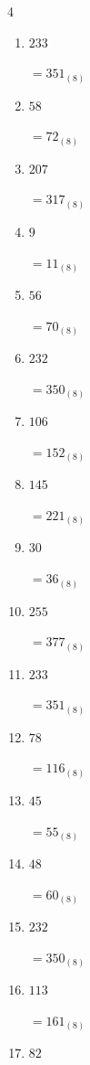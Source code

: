 \begin{multicols}{4}
\begin{enumerate}
  \item $233$

        $=351_{(8)}$

  \item $58$

        $=72_{(8)}$

  \item $207$

        $=317_{(8)}$

  \item $9$

        $=11_{(8)}$

\columnbreak %

  \item $56$

        $=70_{(8)}$

  \item $232$

        $=350_{(8)}$

  \item $106$

        $=152_{(8)}$

  \item $145$

        $=221_{(8)}$

  \item $30$

        $=36_{(8)}$

  \item $255$

        $=377_{(8)}$

  \item $233$

        $=351_{(8)}$

  \item $78$

        $=116_{(8)}$

  \item $45$

        $=55_{(8)}$

  \item $48$

        $=60_{(8)}$

  \item $232$

        $=350_{(8)}$

  \item $113$

        $=161_{(8)}$

  \item $82$


\end{enumerate}
\end{multicols}
